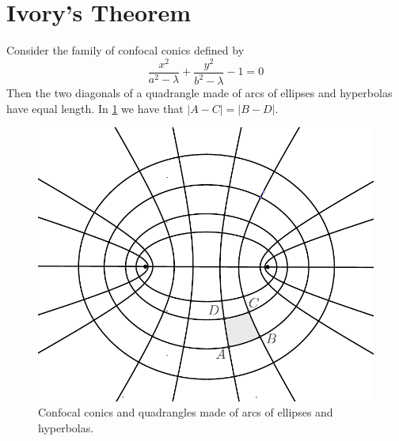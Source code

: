 \section{Ivory's Theorem}

\begin{theorem}\label{prop:ivory}
    Consider the family of confocal conics defined by
    \[\frac{x^2}{a^2-\lambda}+\frac{y^2}{b^2-\lambda}-1=0\]
    Then the two diagonals of a  quadrangle  made of arcs of ellipses and hyperbolas have equal length. In \cref{fig:ivory} we have that $|A-C|=|B-D|.$
\end{theorem}

\begin{figure}
\begin{center}
\includegraphics[scale=0.6]{chap_09/pics/pics_09_010_ivory.pdf}
\caption{ Confocal conics and quadrangles made of arcs of ellipses and hyperbolas.}
\label{fig:ivory}
\end{center}
\end{figure}

